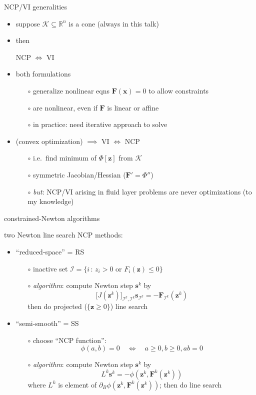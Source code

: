 \documentclass[xcolor={dvipsnames}]{beamer}
\newcommand\bs{\mathbf{s}}
\newcommand\bx{\mathbf{x}}
\newcommand\bz{\mathbf{z}}
\newcommand\bF{\mathbf{F}}
\newcommand\RR{\mathbb{R}}
\begin{document}
\begin{frame}{NCP/VI generalities}

\begin{itemize}
\item suppose $\mathcal{K}\subseteq \RR^n$ is a cone (always in this talk)
\item then
\begin{center}
\alert{NCP $\iff$ VI}
\end{center}
\item both formulations
  \begin{itemize}
  \item[$\circ$]  generalize nonlinear eqns $\bF(\bx)=0$ to allow constraints
  \item[$\circ$]  are nonlinear, even if $\bF$ is linear or affine
  \item[$\circ$]  in practice: need iterative approach to solve
  \end{itemize}
\item (convex optimization) $\implies$ VI $\iff$ NCP
  \begin{itemize}
  \item[$\circ$]  i.e.~find minimum of $\Phi[\bz]$ from $\mathcal{K}$
  \item[$\circ$]  symmetric Jacobian/Hessian ($\bF' = \Phi''$)
  \item[$\circ$]  \emph{but}: NCP/VI arising in fluid layer problems are never optimizations (to my knowledge)
  \end{itemize}
\end{itemize}
\end{frame}


\begin{frame}{constrained-Newton algorithms}

two Newton line search NCP methods:
\begin{itemize}
\item  ``reduced-space'' = \alert{RS}
    \begin{itemize}
    \item[$\circ$] inactive set $\mathcal{I} = \{i \,:\, z_i > 0 \text{ or } F_i(\bz) \le 0\}$
    \item[$\circ$] \emph{algorithm}: compute Newton step $\bs^k$ by
     $$\big[J(\bz^k)\big]_{\mathcal{I}^k,\mathcal{I}^k} \bs_{\mathcal{I}^k} = - \bF_{\mathcal{I}^k}(\bz^k)$$
     then do projected ($\{\bz\ge 0\}$) line search
    \end{itemize}
\item  ``semi-smooth'' = \alert{SS}
    \begin{itemize}
    \item[$\circ$] choose ``NCP function'':
\vspace{-2mm}
    $$\phi(a,b)=0 \quad \iff \quad a\ge 0, b\ge 0, ab=0$$
    \item[$\circ$] \emph{algorithm}: compute Newton step $\bs^k$ by
    $$L^k \bs^k = - \phi(\bz^k,\bF^k(\bz^k))$$
    where $L^k$ is element of $\partial_B \phi(\bz^k,\bF^k(\bz^k))$; then do line search
    \end{itemize}
\end{itemize}
\end{frame}
\end{document}
